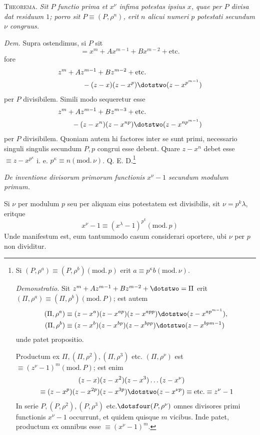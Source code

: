 \textsc{Theorema.} \emph{Sit $P$ functio prima et $x^\nu$ infima potestas ipsius $x$, quae per $P$ divisa dat residuum $1$; porro sit $P\equiv(P,\rho^n)$, erit $n$ alicui numeri $p$ potestati secundum $\nu$ congruus.}

\emph{Dem.} Supra ostendimus, si $P$ sit
\[
=x^m+Ax^{m-1}+Bx^{m-2}+\text{etc.}
\]
fore
\[
\begin{aligned}
z^m+Az^{m-1}+Bz^{m-2}+\text{etc.}\qquad\qquad\qquad\qquad&\\
{}-(z-x)(z-x^p)\dotstwo(z-x^{p^{m-1}})&
\end{aligned}
\]
per $P$ divisibilem. Simili modo sequeretur esse
\[
\begin{aligned}
z^m+Az^{m-1}+Bz^{m-3}+\text{etc.}\qquad\qquad\qquad\qquad&\\
{}-(z-x^n)(z-x^{np})\dotstwo(z-x^{np^{m-1}})&
\end{aligned}
\]
per $P$ divisibilem. Quoniam autem hi factores inter se sunt primi, necessario singuli singulis secundum $P,p$ congrui esse debent. Quare $z-x^n$ debet esse $\equiv z-x^{p^\kappa}$ i. e. $p^\kappa\equiv n(\mathrm{mod.}\,\nu)$. Q. E. D.\begingroup\renewcommand{\thefootnote}{*)}\footnote{Si $(P,\rho^a)\equiv(P,\rho^b)(\mathrm{mod.}\,p)$ erit $a\equiv p^\kappa b(\mathrm{mod.}\,\nu)$.

\emph{Demonstratio.} Sit $z^m+Az^{m-1}+Bz^{m-2}+\dotstwo=\Pi$ erit $(\Pi,\rho^a)\equiv(\Pi,\rho^b)(\mathrm{mod.}\,P)$; est autem
\[
\begin{aligned}
(\Pi,\rho^a)&\equiv(z-x^a)(z-x^{ap})(z-x^{app})\dotstwo(z-x^{ap^{m-1}}),\\
(\Pi,\rho^b)&\equiv(z-x^b)(z-x^{bp})(z-x^{bpp})\dotstwo(z-x^{bpm-1})
\end{aligned}
\]
unde patet propositio.

Productum ex $\Pi,(\Pi,\rho^2),(\Pi,\rho^3)$ etc. $(\Pi,\rho^\nu)$ est $\equiv(z^\nu-1)^m(\mathrm{mod.}\,P)$; est enim
\[
\begin{aligned}
(z-x)(z-x^2)(z-x^3)\ldots(z-x^\nu)&\\
{}\equiv(z-x^p)(z-x^{2p})(z-x^{3p})\dotstwo(z-x^{\nu p})&\equiv\text{etc.}\equiv z^\nu-1
\end{aligned}
\]
In serie $P,(P,\rho^2),(P,\rho^3)$ etc.$\dotsfour(P,\rho^\nu)$ omnes divisores primi functionis $x^\nu-1$ occurrunt, et quidem quisque $m$ vicibus. Inde patet, productum ex omnibus esse $\equiv(x^\nu-1)^m$.}\endgroup

\par\medskip{}
\begin{center}\emph{De inventione divisorum primorum functionis $x^\nu-1$ secundum modulum primum.}\end{center}
Si $\nu$ per modulum $p$ seu per aliquam eius potestatem est divisibilis, sit $\nu=p^k\lambda$, eritque
\[
x^\nu-1\equiv(x^\lambda-1)^{p^k}(\mathrm{mod.}\,p)
\]
Unde manifestum est, eum tantummodo casum considerari oportere, ubi $\nu$ per $p$ non dividitur.

